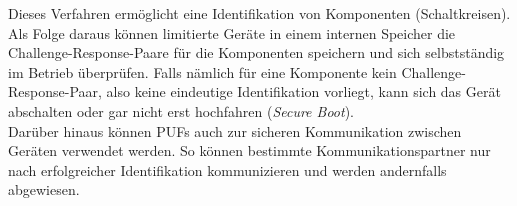 \documentclass[conference]{IEEEtran}
\begin{document}
Dieses Verfahren ermöglicht eine Identifikation von Komponenten (Schaltkreisen). Als Folge daraus können limitierte Geräte in einem internen Speicher die Challenge-Response-Paare für die Komponenten speichern und sich selbstständig im Betrieb überprüfen. Falls nämlich für eine Komponente kein Challenge-Response-Paar, also keine eindeutige Identifikation vorliegt, kann sich das Gerät abschalten oder gar nicht erst hochfahren (\textit{Secure Boot}).\cite{suhdev}\\
Darüber hinaus können PUFs auch zur sicheren Kommunikation zwischen Geräten verwendet werden. So können bestimmte Kommunikationspartner nur nach erfolgreicher Identifikation kommunizieren und werden andernfalls abgewiesen.\cite{itseciot} \cite{eckert2015} 
%
%



%
%
\end{document}
